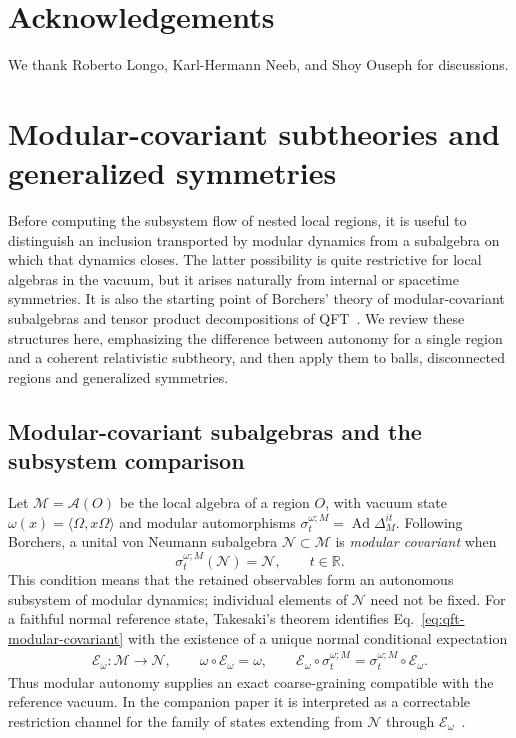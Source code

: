 \documentclass[a4paper,11pt]{article}
\theoremstyle{definition}
\begin{document}
\section*{Acknowledgements}
We thank Roberto Longo, Karl-Hermann Neeb, and Shoy Ouseph for discussions.

\appendix

\section{Modular-covariant subtheories and generalized symmetries}\label{app:qft-subtheories}



Before computing the subsystem flow of nested local regions, it is
useful to distinguish an inclusion transported by modular dynamics from
a subalgebra on which that dynamics closes. The latter possibility is
quite restrictive for local algebras in the vacuum, but it arises
naturally from internal or spacetime symmetries. It is also the starting
point of Borchers' theory of modular-covariant subalgebras and tensor
product decompositions of QFT~\cite{revolutionizing}. We review these
structures here, emphasizing the difference between autonomy for a
single region and a coherent relativistic subtheory, and then apply
them to balls, disconnected regions and generalized symmetries.

\subsection{Modular-covariant subalgebras and the subsystem comparison}
\label{subsec:qft-modular-covariant}
Let $\mathcal M=\mathcal A(O)$ be the local algebra of a region $O$,
with vacuum state $\omega(x)=\langle\Omega,x\Omega\rangle$ and modular
automorphisms $\sigma_t^{\omega;M}=\operatorname{Ad}\Delta_M^{it}$.
Following Borchers, a unital von Neumann subalgebra
$\mathcal N\subset\mathcal M$ is \emph{modular covariant} when
\begin{equation}
 \sigma_t^{\omega;M}(\mathcal N)=\mathcal N,
 \qquad t\in\mathbb R .
 \label{eq:qft-modular-covariant}
\end{equation}
This condition means that the retained observables form an autonomous
subsystem of modular dynamics; individual elements of $\mathcal N$ need
not be fixed. For a faithful normal reference state, Takesaki's theorem
identifies Eq.~\eqref{eq:qft-modular-covariant} with the existence of a
unique normal conditional expectation
\begin{align}
 \mathcal E_\omega:\mathcal M\longrightarrow\mathcal N,
 \qquad \omega\circ\mathcal E_\omega=\omega,
 \qquad
 \mathcal E_\omega\circ\sigma_t^{\omega;M}
   =\sigma_t^{\omega;M}\circ\mathcal E_\omega .
 \label{eq:qft-Takesaki-expectation}
\end{align}
Thus modular autonomy supplies an exact coarse-graining compatible
with the reference vacuum. In the companion paper it is interpreted as
a correctable restriction channel for the family of states extending
from $\mathcal N$ through $\mathcal E_\omega$~\cite{companionQEC}.
\end{document}
